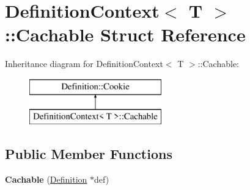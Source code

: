 \hypertarget{struct_definition_context_1_1_cachable}{}\section{Definition\+Context$<$ T $>$\+::Cachable Struct Reference}
\label{struct_definition_context_1_1_cachable}
Inheritance diagram for Definition\+Context$<$ T $>$\+::Cachable\+:\begin{figure}[H]
\begin{center}
\leavevmode
\includegraphics[height=2.000000cm]{struct_definition_context_1_1_cachable}
\end{center}
\end{figure}
\subsection*{Public Member Functions}
\begin{DoxyCompactItemize}
\item 
\mbox{\label{struct_definition_context_1_1_cachable_a26911d345ee67dd99ea1e42072ff2a50}} 
{\bfseries Cachable} (\mbox{\hyperlink{class_definition}{Definition}} $\ast$def)
\end{DoxyCompactItemize}
